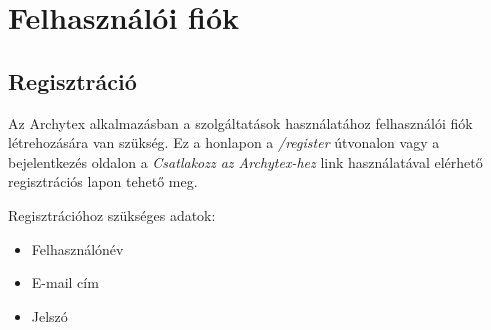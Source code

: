 \section{Felhasználói fiók}

\subsection{Regisztráció}
Az Archytex alkalmazásban a szolgáltatások használatához felhasználói fiók létrehozására van szükség. Ez a honlapon a \emph{/register} útvonalon vagy a bejelentkezés oldalon a \emph{Csatlakozz az Archytex-hez} link használatával elérhető regisztrációs lapon tehető meg.

\begin{samepage}
  \noindent Regisztrációhoz szükséges adatok:
  \begin{itemize}
    \item Felhasználónév
    \item E-mail cím
    \item Jelszó
  \end{itemize}
\end{samepage}

